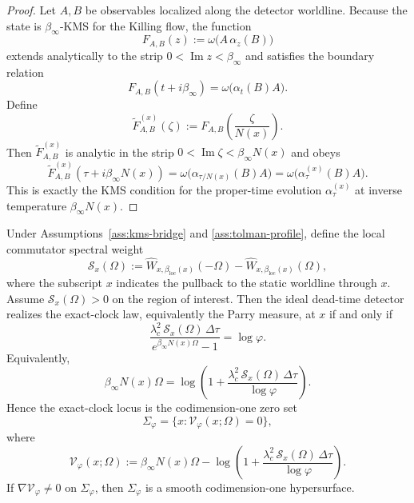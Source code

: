 \begin{proof}
Let $A,B$ be observables localized along the detector worldline. Because the state is $\beta_\infty$-KMS for the Killing flow, the function
\[
F_{A,B}(z):=\omega\bigl(A\,\alpha_z(B)\bigr)
\]
extends analytically to the strip $0<\operatorname{Im} z<\beta_\infty$ and satisfies the boundary relation
\[
F_{A,B}(t+i\beta_\infty)=\omega\bigl(\alpha_t(B)A\bigr).
\]
Define
\[
\widetilde F_{A,B}^{(x)}(\zeta):=F_{A,B}\!\left(\frac{\zeta}{N(x)}\right).
\]
Then $\widetilde F_{A,B}^{(x)}$ is analytic in the strip $0<\operatorname{Im}\zeta<\beta_\infty N(x)$ and obeys
\[
\widetilde F_{A,B}^{(x)}(\tau+i\beta_\infty N(x))
=
\omega\bigl(\alpha_{\tau/N(x)}(B)A\bigr)
=
\omega\bigl(\alpha^{(x)}_\tau(B)A\bigr).
\]
This is exactly the KMS condition for the proper-time evolution $\alpha^{(x)}_\tau$ at inverse temperature $\beta_\infty N(x)$.
\end{proof}

\begin{theorem}\label{thm:static-parry-locus}
Under Assumptions~\ref{ass:kms-bridge} and \ref{ass:tolman-profile}, define the local commutator spectral weight
\begin{equation}\label{eq:local-spectral-weight}
\mathcal S_x(\Omega)
:=
\widehat{W}_{x,\beta_{\mathrm{loc}}(x)}(-\Omega)
-
\widehat{W}_{x,\beta_{\mathrm{loc}}(x)}(\Omega),
\end{equation}
where the subscript $x$ indicates the pullback to the static worldline through $x$. Assume $\mathcal S_x(\Omega)>0$ on the region of interest. Then the ideal dead-time detector realizes the exact-clock law, equivalently the Parry measure, at $x$ if and only if
\begin{equation}\label{eq:static-parry-locus}
\frac{\lambda_c^2\,\mathcal S_x(\Omega)\,\Delta\tau}
     {e^{\beta_\infty N(x)\Omega}-1}
=
\log\varphi.
\end{equation}
Equivalently,
\begin{equation}\label{eq:static-parry-effective}
\beta_\infty N(x)\Omega
=
\log\!\left(
1+\frac{\lambda_c^2\,\mathcal S_x(\Omega)\,\Delta\tau}{\log\varphi}
\right).
\end{equation}
Hence the exact-clock locus is the codimension-one zero set
\[
\Sigma_\varphi
=
\{x:\mathcal V_\varphi(x;\Omega)=0\},
\]
where
\begin{equation}\label{eq:effective-parry-potential}
\mathcal V_\varphi(x;\Omega)
:=
\beta_\infty N(x)\Omega
-
\log\!\left(
1+\frac{\lambda_c^2\,\mathcal S_x(\Omega)\,\Delta\tau}{\log\varphi}
\right).
\end{equation}
If $\nabla\mathcal V_\varphi\neq 0$ on $\Sigma_\varphi$, then $\Sigma_\varphi$ is a smooth codimension-one hypersurface.
\end{theorem}

